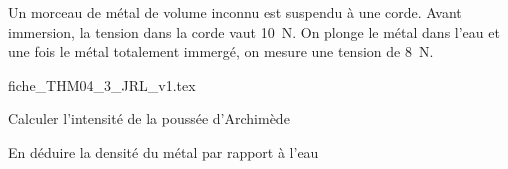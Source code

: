 \hauteurLargeurCadreReponse		{8mm}{1.5cm}
\initialisationEntrainement


\debutEntrainement

Un morceau de métal de volume inconnu est suspendu à une corde. Avant immersion, la tension dans la corde vaut 10~N. On plonge le métal dans l’eau et une fois le métal totalement immergé, on mesure une tension de 8~N.

\begin{center}
{fiche_THM04_3_JRL_v1.tex}
\end{center}

\begin{enonce}
Calculer l'intensité de la poussée d'Archimède
\end{enonce}

\reponse{}


\begin{enonce}
En déduire la densité du métal par rapport à l’eau
\end{enonce}

\reponse{}



\finEntrainement



